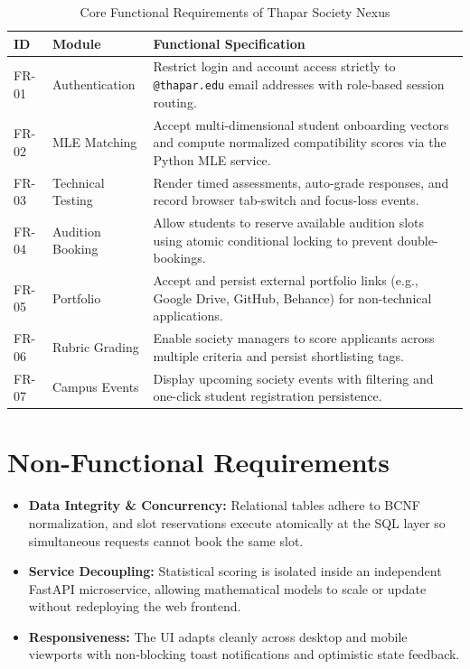 \documentclass[12pt,a4paper]{report}
\begin{document}
\begin{table}[H]
\centering
\renewcommand{\arraystretch}{1.25}
\begin{tabularx}{\textwidth}{@{}l l X@{}}
\toprule
\textbf{ID} & \textbf{Module} & \textbf{Functional Specification} \\
\midrule
FR-01 & Authentication & Restrict login and account access strictly to \texttt{@thapar.edu} email addresses with role-based session routing. \\
FR-02 & MLE Matching & Accept multi-dimensional student onboarding vectors and compute normalized compatibility scores via the Python MLE service. \\
FR-03 & Technical Testing & Render timed assessments, auto-grade responses, and record browser tab-switch and focus-loss events. \\
FR-04 & Audition Booking & Allow students to reserve available audition slots using atomic conditional locking to prevent double-bookings. \\
FR-05 & Portfolio & Accept and persist external portfolio links (e.g., Google Drive, GitHub, Behance) for non-technical applications. \\
FR-06 & Rubric Grading & Enable society managers to score applicants across multiple criteria and persist shortlisting tags. \\
FR-07 & Campus Events & Display upcoming society events with filtering and one-click student registration persistence. \\
\bottomrule
\end{tabularx}
\caption{Core Functional Requirements of Thapar Society Nexus}
\label{tab:frs}
\end{table}

\section{Non-Functional Requirements}
\begin{itemize}[noitemsep]
    \item \textbf{Data Integrity \& Concurrency:} Relational tables adhere to BCNF normalization, and slot reservations execute atomically at the SQL layer so simultaneous requests cannot book the same slot.
    \item \textbf{Service Decoupling:} Statistical scoring is isolated inside an independent FastAPI microservice, allowing mathematical models to scale or update without redeploying the web frontend.
    \item \textbf{Responsiveness:} The UI adapts cleanly across desktop and mobile viewports with non-blocking toast notifications and optimistic state feedback.
\end{itemize}
\end{document}
